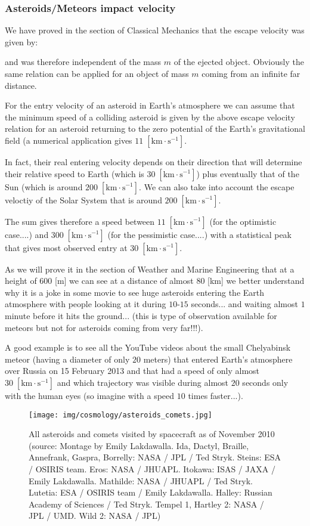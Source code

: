 	
	\subsubsection{Asteroids/Meteors impact velocity}
	We have proved in the section of Classical Mechanics that the escape velocity was given by:
	
	and was therefore independent of the mass $m$ of the ejected object. Obviously the same relation can be applied for an object of mass $m$ coming from an infinite far distance.
	
	For the entry velocity of an asteroid in Earth's atmosphere we can assume that the minimum speed of a colliding asteroid is given by the above escape velocity relation for an asteroid returning to the zero potential of the Earth's gravitational field (a numerical application gives ${11 \;[\text{km}\cdot \text{s}^{-1}]}$.

	In fact, their real entering velocity depends on their direction that will determine their relative speed to Earth (which is ${30  \;[\text{km}\cdot \text{s}^{-1}]}$) plus eventually that of the Sun (which is around ${200  \;[\text{km}\cdot \text{s}^{-1}]}$. We can also take into account the escape veloctiy of the Solar System that is around  ${200  \;[\text{km}\cdot \text{s}^{-1}]}$.

	The sum gives therefore a speed between ${11 \;[\text{km}\cdot \text{s}^{-1}]}$ (for the optimistic case....) and ${300  \;[\text{km}\cdot \text{s}^{-1}]}$ (for the pessimistic case....) with a statistical peak that gives most observed entry at ${30 \;[\text{km}\cdot \text{s}^{-1}]}$.

	As we  will prove it in the section of Weather and Marine Engineering that at a height of $600$ [m] we can see at a distance of almost $80$ [km] we better understand why it is a joke in some movie to see huge asteroids entering the Earth atmosphere with people looking at it during $10$-$15$ seconds... and waiting almost $1$ minute before it hits the ground... (this is type of observation available for meteors but not for asteroids coming from very far!!!).

	A good example is to see all the YouTube videos about the small Chelyabinsk meteor (having a diameter of only $20$ meters) that entered Earth's atmosphere over Russia on 15 February 2013 and that had a speed of only almost  $30 \;[\text{km}\cdot \text{s}^{-1}]$ and which trajectory was visible during almost $20$ seconds only with the human eyes (so imagine with a speed $10$ times faster...).
	\begin{figure}[H]
		\centering
		\texttt{[image: img/cosmology/asteroids\_comets.jpg]}	
		\caption[All asteroids and comets visited by spacecraft as of November 2010]{All asteroids and comets visited by spacecraft as of November 2010 (source: Montage by Emily Lakdawalla. Ida, Dactyl, Braille, Annefrank, Gaspra, Borrelly: NASA / JPL / Ted Stryk. Steins: ESA / OSIRIS team. Eros: NASA / JHUAPL. Itokawa: ISAS / JAXA / Emily Lakdawalla. Mathilde: NASA / JHUAPL / Ted Stryk. Lutetia: ESA / OSIRIS team / Emily Lakdawalla. Halley: Russian Academy of Sciences / Ted Stryk. Tempel 1, Hartley 2: NASA / JPL / UMD. Wild 2: NASA / JPL)}
	\end{figure}
	
